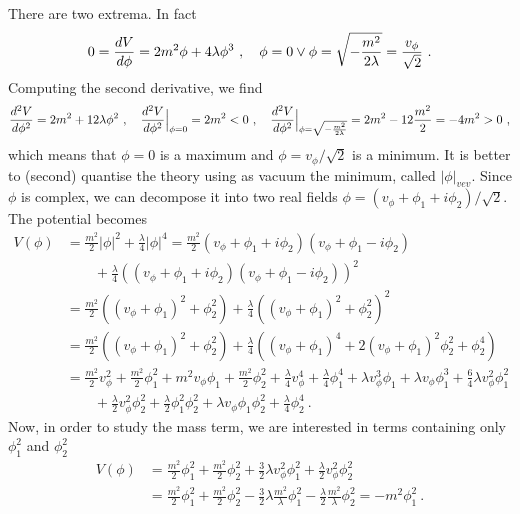     There are two extrema. In fact 
    \begin{equation*}
        0 = \frac{dV}{d\phi} = 2 m^2 \phi + 4 \lambda \phi^3 ~, \quad \phi = 0 \lor \phi = \sqrt{- \frac{m^2}{2 \lambda}} = \frac{v_\phi}{\sqrt{2}} ~.
    \end{equation*}
    Computing the second derivative, we find 
    \begin{equation*}
        \frac{d^2V}{d\phi^2} = 2 m^2 + 12 \lambda \phi^2 ~, \quad \frac{d^2V}{d\phi^2} \Big \vert_{\phi = 0} = 2 m^2 < 0 ~, \quad \frac{d^2V}{d\phi^2} \Big \vert_{\phi = \sqrt{- \frac{m^2}{2 \lambda}}} = 2 m^2 - 12 \frac{m^2}{2} = - 4 m^2 > 0 ~,
    \end{equation*}
    which means that $\phi = 0$ is a maximum and $\phi = v_\phi / \sqrt{2}$ is a minimum. It is better to (second) quantise the theory using as vacuum the minimum, called $|\phi|_{vev}$. Since $\phi$ is complex, we can decompose it into two real fields $\phi = (v_\phi + \phi_1 + i \phi_2) / \sqrt{2}$. The potential becomes 
    \begin{equation*}
    \begin{aligned}
        V(\phi) & = \frac{m^2}{2} |\phi|^2 + \frac{\lambda}{4} |\phi|^4 = \frac{m^2}{2} (v_\phi + \phi_1 + i \phi_2) (v_\phi + \phi_1 - i \phi_2) \\ & \qquad + \frac{\lambda}{4} ((v_\phi + \phi_1 + i \phi_2) (v_\phi + \phi_1 - i \phi_2))^2 \\ & = \frac{m^2}{2} ((v_\phi + \phi_1)^2 + \phi_2^2) + \frac{\lambda}{4} ((v_\phi + \phi_1)^2 + \phi_2^2)^2 \\ & = \frac{m^2}{2} ((v_\phi + \phi_1)^2 + \phi_2^2) + \frac{\lambda}{4} ((v_\phi + \phi_1)^4 + 2 (v_\phi + \phi_1)^2 \phi_2^2 + \phi_2^4) \\ & = \frac{m^2}{2} v_\phi^2 + \frac{m^2}{2} \phi_1^2 + m^2 v_\phi \phi_1 + \frac{m^2}{2} \phi_2^2 + \frac{\lambda}{4} v_\phi^4 + \frac{\lambda}{4} \phi_1^4 + \lambda v_\phi^3 \phi_1 + \lambda v_\phi \phi_1^3 + \frac{6}{4} \lambda v_\phi^2 \phi_1^2 \\ & \qquad + \frac{\lambda}{2} v_\phi^2 \phi_2^2 + \frac{\lambda}{2} \phi_1^2 \phi_2^2 + \lambda v_\phi \phi_1 \phi_2^2 + \frac{\lambda}{4} \phi_2^4  ~.
    \end{aligned}
    \end{equation*}
    Now, in order to study the mass term, we are interested in terms containing only $\phi_1^2$ and $\phi_2^2$
    \begin{equation*}
    \begin{aligned}
        V(\phi) & = \frac{m^2}{2} \phi_1^2 + \frac{m^2}{2} \phi_2^2 + \frac{3}{2} \lambda v_\phi^2 \phi_1^2 + \frac{\lambda}{2} v_\phi^2 \phi_2^2 \\ & = \frac{m^2}{2} \phi_1^2 + \frac{m^2}{2} \phi_2^2 - \frac{3}{2} \lambda \frac{m^2}{\lambda} \phi_1^2 - \frac{\lambda}{2} \frac{m^2}{\lambda} \phi_2^2 = - m^2 \phi_1^2 ~.
    \end{aligned}
    \end{equation*}
